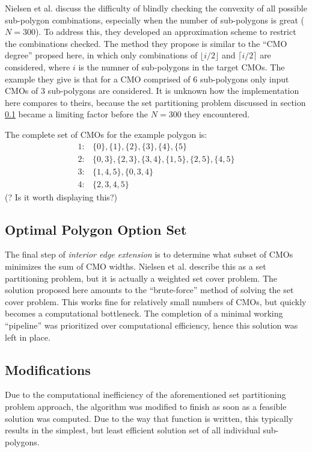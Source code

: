 Nielsen et al. discuss the difficulty of blindly checking the convexity of all possible sub-polygon combinations, especially when the number of sub-polygons is great ($N=300$)\cite{IntEdgeExt}.
To address this, they developed an approximation scheme to restrict the combinations checked.
The method they propose is similar to the ``CMO degree'' propsed here, in which only combinations of $\lfloor i/2 \rfloor$ and $\lceil i/2 \rceil$ are considered, where $i$ is the numner of sub-polygons in the target CMOs.
The example they give is that for a CMO comprised of 6 sub-polygons only input CMOs of 3 sub-polygons are considered.
It is unknown how the implementation here compares to theirs, because the set partitioning problem discussed in section \ref{OptimalCMOs} became a limiting factor before the $N=300$ they encountered.

The complete set of CMOs for the example polygon is:
\[
\begin{split}
	1:& \{0\},\{1\},\{2\},\{3\},\{4\},\{5\}\\
	2:& \{0,3\},\{2,3\},\{3,4\},\{1,5\},\{2,5\},\{4,5\}\\
	3:& \{1,4,5\},\{0,3,4\}\\
	4:& \{2,3,4,5\}
\end{split}
\]
(? Is it worth displaying this?)

\subsection{Optimal Polygon Option Set}\label{OptimalCMOs}
The final step of \textit{interior edge extension} is to determine what subset of CMOs minimizes the sum of CMO widths.
Nielsen et al. describe this as a set partitioning problem\cite{IntEdgeExt}, but it is actually a weighted set cover problem.
The solution proposed here amounts to the ``brute-force'' method of solving the set cover problem.
This works fine for relatively small numbers of CMOs, but quickly becomes a computational bottleneck.
The completion of a minimal working ``pipeline'' was prioritized over computational efficiency, hence this solution was left in place.

\subsection{Modifications}
Due to the computational inefficiency of the aforementioned set partitioning problem approach, the algorithm was modified to finish as soon as a feasible solution was computed.
Due to the way that function is written, this typically results in the simplest, but least efficient solution set of all individual sub-polygons.

